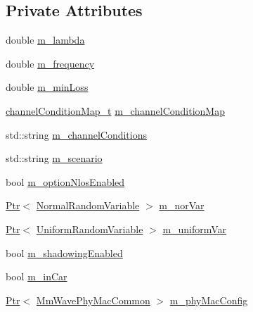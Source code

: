 \subsection*{Private Attributes}
\begin{DoxyCompactItemize}
\item 
double \hyperlink{classMmWave3gppPropagationLossModel_af93c26bcd20ec903b0c70afa4c59cde2}{m\+\_\+lambda}
\item 
double \hyperlink{classMmWave3gppPropagationLossModel_a2e61a4ea86089b9f974dbbb5180f9c86}{m\+\_\+frequency}
\item 
double \hyperlink{classMmWave3gppPropagationLossModel_a77d24e66b9afc8afd0a7e52d3735d557}{m\+\_\+min\+Loss}
\item 
\hyperlink{mmwave-3gpp-propagation-loss-model_8h_a76b21036afebb8764ee4bfe0aa80e806}{channel\+Condition\+Map\+\_\+t} \hyperlink{classMmWave3gppPropagationLossModel_a47c60c0cfcc0545dd3039393d21de5ac}{m\+\_\+channel\+Condition\+Map}
\item 
std\+::string \hyperlink{classMmWave3gppPropagationLossModel_a416f5b42f67f2d950344b4746885230d}{m\+\_\+channel\+Conditions}
\item 
std\+::string \hyperlink{classMmWave3gppPropagationLossModel_a3ba2b9e45f4d02e49620faf03f97e898}{m\+\_\+scenario}
\item 
bool \hyperlink{classMmWave3gppPropagationLossModel_a5029858358d3c4dac793ebf3c8c6cc09}{m\+\_\+option\+Nlos\+Enabled}
\item 
\hyperlink{classns3_1_1Ptr}{Ptr}$<$ \hyperlink{classns3_1_1NormalRandomVariable}{Normal\+Random\+Variable} $>$ \hyperlink{classMmWave3gppPropagationLossModel_a513eea17719ec9c16c3f4e215b018ce9}{m\+\_\+nor\+Var}
\item 
\hyperlink{classns3_1_1Ptr}{Ptr}$<$ \hyperlink{classns3_1_1UniformRandomVariable}{Uniform\+Random\+Variable} $>$ \hyperlink{classMmWave3gppPropagationLossModel_a03532a0deaf28490552b0ba27bae9afa}{m\+\_\+uniform\+Var}
\item 
bool \hyperlink{classMmWave3gppPropagationLossModel_ac5ba12ef57c52196b6434d801d2e22af}{m\+\_\+shadowing\+Enabled}
\item 
bool \hyperlink{classMmWave3gppPropagationLossModel_a2d089e3f89e3cc67c7ea6499a6eca943}{m\+\_\+in\+Car}
\item 
\hyperlink{classns3_1_1Ptr}{Ptr}$<$ \hyperlink{classns3_1_1MmWavePhyMacCommon}{Mm\+Wave\+Phy\+Mac\+Common} $>$ \hyperlink{classMmWave3gppPropagationLossModel_adae341d51b71d1cb4b9f9650e0f90aff}{m\+\_\+phy\+Mac\+Config}
\end{DoxyCompactItemize}
